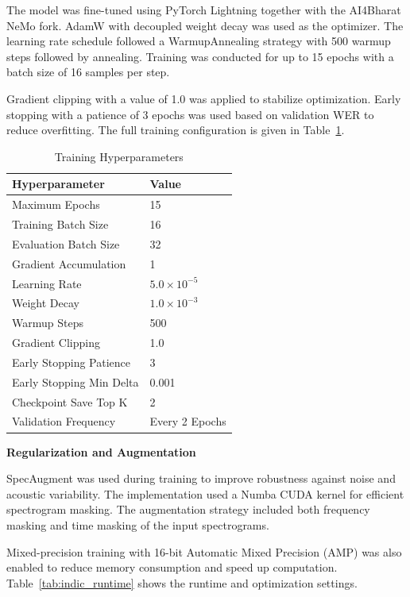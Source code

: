 The model was fine-tuned using PyTorch Lightning together with the AI4Bharat NeMo fork. AdamW with decoupled weight decay was used as the optimizer. The learning rate schedule followed a WarmupAnnealing strategy with 500 warmup steps followed by annealing. Training was conducted for up to 15 epochs with a batch size of 16 samples per step.

Gradient clipping with a value of 1.0 was applied to stabilize optimization. Early stopping with a patience of 3 epochs was used based on validation WER to reduce overfitting. The full training configuration is given in Table~\ref{tab:indic_train}.

\begin{table}[H]
\caption{Training Hyperparameters}
\label{tab:indic_train}
\centering
\begin{tabular}{|l|l|}
\hline
\textbf{Hyperparameter} & \textbf{Value} \\
\hline
Maximum Epochs & 15 \\
Training Batch Size & 16 \\
Evaluation Batch Size & 32 \\
Gradient Accumulation & 1 \\
Learning Rate & $5.0\times10^{-5}$ \\
Weight Decay & $1.0\times10^{-3}$ \\
Warmup Steps & 500 \\
Gradient Clipping & 1.0 \\
Early Stopping Patience & 3 \\
Early Stopping Min Delta & 0.001 \\
Checkpoint Save Top K & 2 \\
Validation Frequency & Every 2 Epochs \\
\hline
\end{tabular}
\end{table}

\textbf{Regularization and Augmentation}

SpecAugment was used during training to improve robustness against noise and acoustic variability. The implementation used a Numba CUDA kernel for efficient spectrogram masking. The augmentation strategy included both frequency masking and time masking of the input spectrograms.

Mixed-precision training with 16-bit Automatic Mixed Precision (AMP) was also enabled to reduce memory consumption and speed up computation. Table~\ref{tab:indic_runtime} shows the runtime and optimization settings.

